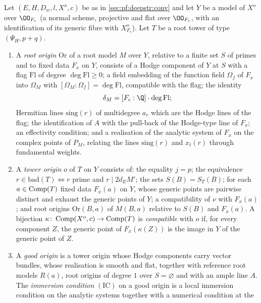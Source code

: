 \begin{definition}\label{def:pf:deepstr:origins}
Let $(E,H,D_w,l,X^o,c)$ be as in \cref{sec:pf:deepstr:conv} and let $Y$ be a model of $X^o$ over $\OO_{F_c}$
(a normal scheme, projective and flat over $\OO_{F_c}$, with an identification of its generic fibre with
$X^o_{F_c}$). Let $T$ be a root tower of type $(\Psi_H,p+q)$.
\begin{enumerate}[label=(\alph*)]
\item A \emph{root origin} $\mathrm{Or}$ of a root model $M$ over $Y$, relative to a finite set $S$ of
primes and to fixed data $F_x$ on $Y$, consists of a Hodge component of $Y$ at $S$ with a flag $\mathrm{Fl}$
of degree $\deg\mathrm{Fl}\ge0$; a field embedding of the function field $\Omega_f$ of $F_x$ into $\Omega_M$ with
$[\Omega_M:\Omega_f]=\deg\mathrm{Fl}$, compatible with the flag; the identity
\begin{equation}\label{eq:pf:deepstr:deltaeq}
\delta_M=[F_c:\Q]\cdot\deg\mathrm{Fl};
\end{equation}
Hermitian lines $\mathrm{sing}(r)$ of multidegree $a_r$ which are the Hodge lines of the flag; the
identification of $A$ with the pull-back of the Hodge-type line of $F_x$; an effectivity condition; and a
realisation of the analytic system of $F_x$ on the complex points of $P_M$, relating the lines
$\mathrm{sing}(r)$ and $x_t(r)$ through fundamental weights.
\item A \emph{tower origin} $o$ of $T$ on $Y$ consists of: the equality $j=p$; the equivalence
$r\in\mathrm{bad}(T)\iff r$ prime and $r\mid2d_EM'$; the sets $S(B)=S_T(B)$; for each $a\in\operatorname{Comp}(T)$
fixed data $F_x(a)$ on $Y$, whose generic points are pairwise distinct and exhaust the generic points of
$Y$; a compatibility of $\nu$ with $F_x(a)$; and root origins $\mathrm{Or}(B,a)$ of $M(B,a)$ relative to
$S(B)$ and $F_x(a)$. A bijection $\kappa\colon\operatorname{Comp}(X^o,c)\to\operatorname{Comp}(T)$ is \emph{compatible} with $o$ if,
for every component $Z$, the generic point of $F_x(\kappa(Z))$ is the image in $Y$ of the generic point of $Z$.
\item A \emph{good origin} is a tower origin whose Hodge components carry vector bundles, whose
realisation is smooth and flat, together with reference root models $R(a)$, root origins of degree $1$
over $S=\varnothing$ and with an ample line $A$. The \emph{immersion condition} $\mathrm{(IC)}$ on a good
origin is a local immersion condition on the analytic systems together with a numerical condition at the

\end{enumerate}
\end{definition}
